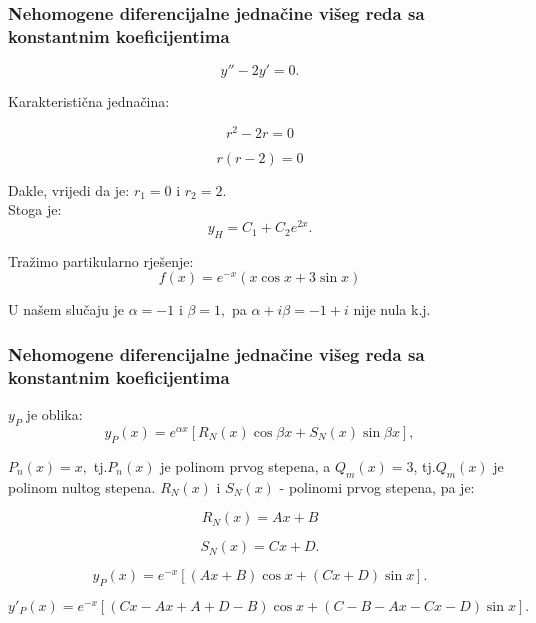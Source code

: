 \documentclass{beamer}
\begin{document}
\begin{frame}
\frametitle{Nehomogene diferencijalne jednačine višeg reda sa konstantnim koeficijentima}
$$y'' - 2y' = 0. $$

 Karakteristična jednačina:
 
$$r^{2} - 2r = 0$$

$$r(r - 2) = 0$$

Dakle, vrijedi da je: $r_{1}= 0$ i $r_{2}= 2.$\\

Stoga je: $$y_{H} = C_{1} + C_{2}e^{2x}.$$

Tražimo partikularno rješenje:\\

$$f(x) = e^{-x}(x\cos{x} + 3 \sin{x})$$

U našem slučaju je $\alpha = -1$ i $\beta = 1, $ pa $\alpha + i \beta = -1 + i $ nije  nula k.j.


\end{frame}
\begin{frame}
\frametitle{Nehomogene diferencijalne jednačine višeg reda sa konstantnim koeficijentima}
$y_{P}$ je oblika: \\

$$y_{P}(x) = e^{\alpha x}[R_{N}(x) \cos{\beta x} + S_{N}(x) \sin{\beta x}], $$

$P_{n}(x) = x, $ tj.$P_{n}(x) $  je polinom prvog stepena,  a $Q_{m}(x) = 3$, tj.$Q_{m}(x) $ je polinom nultog stepena.
$R_{N}(x)$  i $S_{N}(x)$ - polinomi prvog stepena,  pa je:

$$R_{N}(x) = Ax + B$$ 

$$S_{N}(x) = Cx +D.$$ 

$$y_{P}(x) = e^{- x}[(Ax + B) \cos{x} + (Cx +D) \sin{ x}] .$$

$$y'_{P}(x) = e^{- x}[(Cx - Ax + A + D -B) \cos{x} + (C - B - Ax -Cx -D) \sin{ x}] .$$ 



\end{frame}
\end{document}
